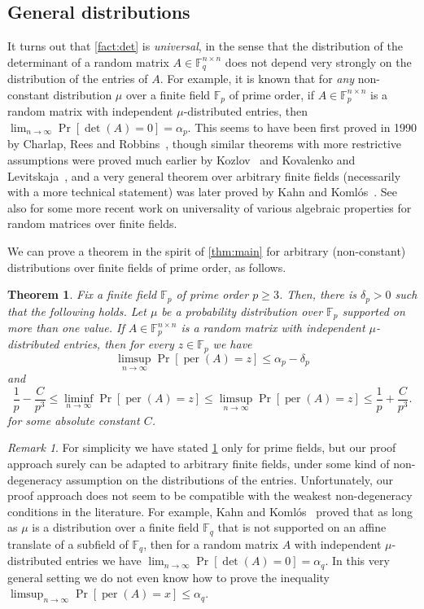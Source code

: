 \documentclass[10pt,reqno]{amsart}
\numberwithin{equation}{section}
\newtheorem{theorem}{Theorem}[section]
\theoremstyle{remark}
\newtheorem*{remark}{Remark}
\newcommand{\mb}{\mathbb}
\newcommand{\on}{\operatorname}
\begin{document}
\subsection{General distributions}
It turns out that \cref{fact:det} is \emph{universal}, in the sense that the distribution of the determinant of a random matrix $A\in \mb F_q^{n\times n}$ does not depend very strongly on the distribution of the entries of $A$. For example, it is known that for \emph{any} non-constant distribution $\mu$ over a  finite field $\mb F_p$ of prime order, if $A\in \mb F_p^{n\times n}$ is a random matrix with independent $\mu$-distributed entries, then $\lim_{n\to \infty }\Pr[\det(A)=0]=\alpha_p$. This seems to have been first proved in 1990 by Charlap, Rees and Robbins~\cite{CRR90}, though similar theorems with more restrictive assumptions were proved much earlier by Kozlov~\cite{Koz} and Kovalenko and Levitskaja~\cite{KL75}, and a very general theorem over arbitrary finite fields (necessarily with a more technical statement) was later proved by Kahn and Koml\'os~\cite{KK01}. See also \cite{Map10,Map13,Woo17,Woo19,NW22,Ebe22,LMN21} for some more recent work on universality of various algebraic properties for random matrices over finite fields.


We can prove a theorem in the spirit of \cref{thm:main} for arbitrary (non-constant) distributions over finite fields of prime order, as follows.
\begin{theorem}\label{thm:general}
Fix a finite field $\mathbb{F}_{p}$ of prime order $p\ge 3$. Then, there is $\delta_p>0$ such that the following holds.
Let $\mu$ be a probability distribution over $\mb F_p$ supported on more than one value. If $A\in\mathbb{F}_{p}^{n\times n}$ is a random matrix with independent $\mu$-distributed entries, then for every $z\in \mb F_p$ we have
\begin{equation}
\limsup_{n\to\infty}\Pr[\on{per}(A)=z]\le\alpha_{p}-\delta_{p} \label{eq:separation-general}   
\end{equation}
and
\begin{equation}
\frac{1}{p}-\frac{C}{p^{3}}\le \liminf_{n\to\infty}\Pr[\on{per}(A)=z]\le \limsup_{n\to\infty}\Pr[\on{per}(A)=z]\le \frac{1}{p}+\frac{C}{p^{3}}.    \label{eq:asymptotic-general}
\end{equation}
for some absolute constant $C$.
\end{theorem}
\begin{remark}
For simplicity we have stated \cref{thm:general} only for prime fields, but our proof approach surely can be adapted to arbitrary finite fields, under some kind of non-degeneracy assumption on the distributions of the entries. Unfortunately, our proof approach does not seem to be compatible with the weakest non-degeneracy conditions in the literature. For example, Kahn and Koml\'os~\cite{KK01} proved that as long as $\mu$ is a distribution over a finite field $\mb F_q$ that is not supported on an affine translate of a subfield of $\mb F_q$, then for a random matrix $A$ with independent $\mu$-distributed entries we have $\lim_{n\to\infty}\Pr[\det(A)=0]=\alpha_q$. In this very general setting we do not even know how to prove the inequality $\limsup_{n\to\infty}\Pr[\on{per}(A)=x]\le \alpha_q$.
\end{remark}
\end{document}
